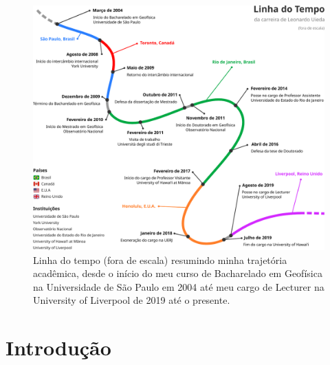 \documentclass[10pt,a4paper,oneside]{book}
\begin{document}
\begin{figure}[pb]
  \begin{center}
    \includegraphics[width=\textwidth]{images/timeline.pdf}
  \end{center}
  \caption*{
    Linha do tempo (fora de escala) resumindo minha trajetória acadêmica, desde
    o início do meu curso de Bacharelado em Geofísica na Universidade de São
    Paulo em 2004 até meu cargo de Lecturer na University of Liverpool de 2019
    até o presente.
  }
\end{figure}

\tableofcontents

\mainmatter
\pagestyle{fancy}

\chapter{Introdução}
\end{document}
